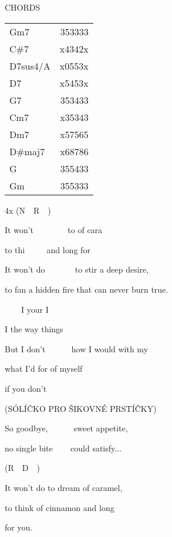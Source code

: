 

CHORDS

\begin{tabular}{ l r }
  Gm7      &  353333\\
  C\#7      &  x4342x\\
  D7sus4/A &  x0553x\\
  D7       &  x5453x\\
  G7       &  353433\\
  Cm7      &  x35343\\
  Dm7      &  x57565\\
  D\#maj7   &  x68786\\
  G        &  355433\\
  Gm       &  355333\\
\end{tabular}

4x (N~~R~~)

\zs
It won't  ~~~~~~~ to  of cara

to thi ~~~~ and long for  ~  ~ 
\ks

\zs
It won't do ~~~~~~ to stir a deep desire,

to fan a hidden fire that can never burn true.
\ks

\zr
{}~~~~I  your  I  

I  the way  things 

But I don't  ~~~~~ how I would  with my

what I'd for of myself

if you don't  ~
\kr

\zs (SÓLÍČKO PRO ŠIKOVNÉ PRSTÍČKY)\ks

\zs
So goodbye, ~~~~~ sweet appetite,

no single bite ~~~ could satisfy...
\ks

\zr\kr

(R~~D~~)

\zs
It won't do        to dream of caramel, 

to think of cinnamon      and long

for you.
\ks
\kp
